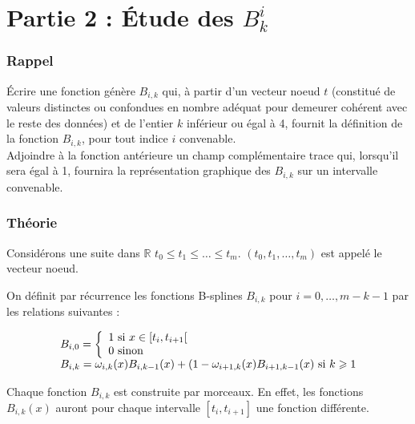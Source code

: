 \documentclass[a4paper,10pt]{report}
\begin{document}
\chapter*{Partie 2 : Étude des $B^{i}_{k}$}

\subsection*{Rappel}

Écrire une fonction génère $B_{i,k}$ qui, à partir d’un vecteur noeud $t$ (constitué de valeurs distinctes ou confondues en nombre adéquat pour demeurer cohérent avec le reste des données) et de l’entier $k$ inférieur ou égal à 4, fournit la définition de la fonction $B_{i,k}$, pour tout indice $i$ convenable.\\

Adjoindre à la fonction antérieure un champ complémentaire trace qui, lorsqu’il sera égal à 1, fournira la représentation graphique des $B_{i,k}$ sur un intervalle convenable.


\subsection*{Théorie}

Considérons une suite dans $\mathbb{R}$ $t_0 \leqslant t_1 \leqslant … \leqslant t_m$. $(t_0, t_1, …, t_m)$ est appelé le vecteur noeud. 

On définit par récurrence les fonctions B-splines $B_{i,k}$ pour $i = 0, … , m-k-1$ par les relations suivantes :

\begin{equation}
	\begin{array}{ll}
	B_{i,0} = \left\{
                \begin{array}{ll}
                  1 $ si $x \in [t_{i}, t_{i+1}[\\
                  0 $ sinon$
                \end{array}
              \right.\\              
    B_{i,k} = \omega_{i, k}(x)B_{i,k-1}(x) + (1 - \omega_{i+1, k}(x)B_{i+1,k-1}(x)$ si $ k \geqslant 1
    \end{array}
\end{equation}

Chaque fonction $B_{i,k}$ est construite par morceaux. En effet, les fonctions $B_{i,k}(x)$ auront pour chaque intervalle $[t_i,t_{i+1}]$ une fonction différente.
\end{document}
